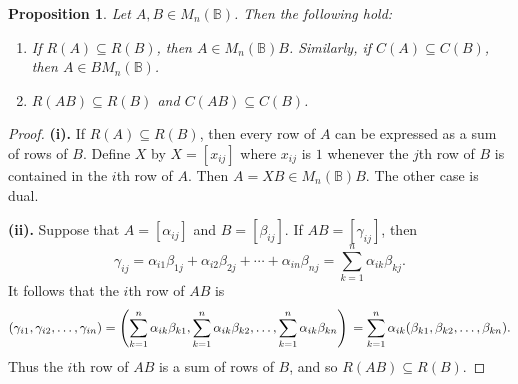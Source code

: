 \documentclass[11pt]{article}
\newtheorem{prop}[thm]{Proposition}
\numberwithin{equation}{section}
\newcommand{\B}{\mathbb{B}}
\newcommand{\Bn}{M_n(\B)}
\begin{document}
\begin{prop} 
  Let $A, B \in \Bn$. Then the following hold:
  \begin{enumerate}[\rm (i)]

    \item
      If $R(A) \subseteq R(B)$, then $A \in \Bn B$.  Similarly, if $C(A)
      \subseteq C(B)$, then $A \in B \Bn$.

    \item 
      $R(AB) \subseteq R(B)$ and $C(AB) \subseteq C(B)$.
  \end{enumerate}
\end{prop}
\begin{proof}
  \noindent \textbf{(i).}
  If $R(A) \subseteq R(B)$, then every row of $A$ can be expressed as a sum of
  rows of $B$. Define $X$ by $X = [x_{ij}]$ where $x_{ij}$ is $1$ whenever the
  $j$th row of $B$ is contained in the $i$th row of $A$. Then $A = XB \in \Bn
  B$.  The other case is dual.
  \bigskip

  \noindent \textbf{(ii).}
  Suppose that $A = [\alpha_{ij}]$ and $B = [\beta_{ij}]$. If 
  $AB = [\gamma_{ij}]$, then 
  \[
  \gamma_{ij} = \alpha_{i1} \beta_{1j} + \alpha_{i2}\beta_{2j} 
                + \cdots + \alpha_{in}\beta_{nj}
              = \sum_{k = 1} ^ {n} \alpha_{ik}\beta_{kj}.
  \]
  It follows that the $i$th row of $AB$ is 
  \[
  (\gamma_{i1}, \gamma_{i2}, \ldots, \gamma_{in})
   =  \left (\sum_{k = 1} ^ {n} \alpha_{ik}\beta_{k1},
     \sum_{k = 1} ^ {n} \alpha_{ik}\beta_{k2},
     \ldots, 
     \sum_{k = 1} ^ {n} \alpha_{ik}\beta_{kn}\right) \\
    =
    \sum_{k = 1} ^ {n} 
    \alpha_{ik}
    (\beta_{k1}, \beta_{k2}, \ldots, \beta_{kn}).
  \]
  Thus the $i$th row of $AB$ is a sum of rows of $B$, and so $R(AB) \subseteq
  R(B)$. 
\end{proof}
\end{document}
